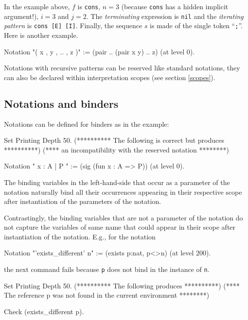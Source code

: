 In the example above, $f$ is {\tt cons}, $n=3$ (because {\tt cons} has
a hidden implicit argument!), $i=3$ and $j=2$. The {\em terminating}
expression is {\tt nil} and the {\em iterating pattern} is {\tt cons
{\rm [E] [I]}}. Finally, the sequence $s$ is made of the single token
``{\tt ;}''. Here is another example.
\begin{coq_example*}
Notation "( x , y , .. , z )" := (pair .. (pair x y) .. z) (at level 0).
\end{coq_example*}

Notations with recursive patterns can be reserved like standard
notations, they can also be declared within interpretation scopes (see
section \ref{scopes}).

\subsection{Notations and binders}

Notations can be defined for binders as in the example:

\begin{coq_eval}
Set Printing Depth 50.
(********** The following is correct but produces **********)
(**** an incompatibility with the reserved notation ********)
\end{coq_eval}
\begin{coq_example*}
Notation "{ x : A  |  P  }" := (sig (fun x : A => P)) (at level 0).
\end{coq_example*}

The binding variables in the left-hand-side that occur as a parameter
of the notation naturally bind all their occurrences appearing in
their respective scope after instantiation of the parameters of the
notation.

Contrastingly, the binding variables that are not a parameter of the
notation do not capture the variables of same name that
could appear in their scope after instantiation of the
notation. E.g., for the notation

\begin{coq_example*}
Notation "'exists_different' n" := (exists p:nat, p<>n) (at level 200).
\end{coq_example*}
the next command fails because {\tt p} does not bind in 
the instance of {\tt n}.
\begin{coq_eval}
Set Printing Depth 50.
(********** The following produces **********)
(**** The reference p was not found in the current environment ********)
\end{coq_eval}
\begin{coq_example}
Check (exists_different p).
\end{coq_example}

